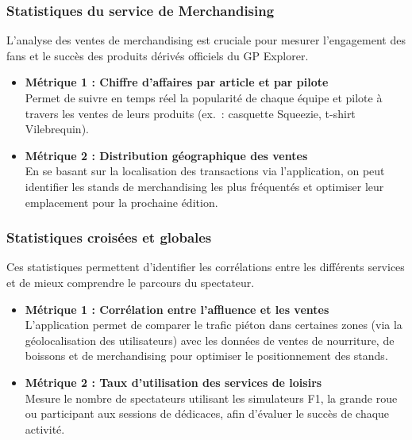 \documentclass[12pt,a4paper]{article}
\begin{document}
\subsubsection{Statistiques du service de Merchandising}

L'analyse des ventes de merchandising est cruciale pour mesurer l'engagement des fans et le succès des produits dérivés officiels du GP Explorer.

\begin{itemize}
    \item \textbf{Métrique 1 : Chiffre d'affaires par article et par pilote} \\
    Permet de suivre en temps réel la popularité de chaque équipe et pilote à travers les ventes de leurs produits (ex.~: casquette Squeezie, t-shirt Vilebrequin).

    \item \textbf{Métrique 2 : Distribution géographique des ventes} \\
    En se basant sur la localisation des transactions via l'application, on peut identifier les stands de merchandising les plus fréquentés et optimiser leur emplacement pour la prochaine édition.
\end{itemize}

\subsubsection{Statistiques croisées et globales}

Ces statistiques permettent d'identifier les corrélations entre les différents services et de mieux comprendre le parcours du spectateur.

\begin{itemize}
    \item \textbf{Métrique 1 : Corrélation entre l'affluence et les ventes} \\
    L'application permet de comparer le trafic piéton dans certaines zones (via la géolocalisation des utilisateurs) avec les données de ventes de nourriture, de boissons et de merchandising pour optimiser le positionnement des stands.

    \item \textbf{Métrique 2 : Taux d'utilisation des services de loisirs} \\
    Mesure le nombre de spectateurs utilisant les simulateurs F1, la grande roue ou participant aux sessions de dédicaces, afin d'évaluer le succès de chaque activité.
\end{itemize}
\end{document}
